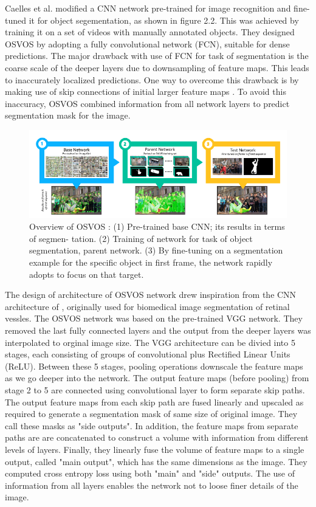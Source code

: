 Caelles et al. \cite{osvos} modified a CNN network pre-trained for image recognition and fine-tuned it for object segementation, as shown in figure 2.2. This was achieved by training it on a set of videos with manually annotated objects. They designed OSVOS by adopting a fully convolutional network (FCN), suitable for dense predictions. The major drawback with use of FCN for task of segmentation is the coarse scale of the deeper layers due to downsampling of feature maps. This leads to inaccurately localized predictions. One way to overcome this drawback is by making use of skip connections of initial larger feature maps \cite{unet}. To avoid this inaccuracy, OSVOS combined information from all network layers to predict segmentation mask for the image. \par

\begin{figure}[h!]\label{fig:osvos1}
\centering
 \includegraphics[width=1.0\linewidth]{figures/osvos_train.png} 
\caption{Overview of OSVOS \cite{osvos}: (1) Pre-trained base CNN; its results in terms of segmen-
tation. (2) Training of network for task of object segmentation, parent network. (3) By fine-tuning on a segmentation example for the specific object in first frame, the network rapidly adopts to focus on that target.
}
\end{figure}

 The design of architecture of OSVOS network drew inspiration from the CNN architecture of \cite{maninis:2016}, originally used for biomedical image segmentation of retinal vessles. The OSVOS network was based on the pre-trained VGG \cite{vgg} network. They removed the last fully connected layers and the output from the deeper layers was interpolated to orginal image size. The VGG architecture can be divied into 5 stages, each consisting of groups of convolutional plus Rectified Linear Units (ReLU). Between these  5 stages, pooling operations downscale the feature maps as we go deeper into the network. The output feature maps (before pooling) from stage 2 to 5 are connected using convolutional layer to form separate skip paths. The output feature maps from each skip path are fused linearly and upscaled as required to generate a segmentation mask of same size of original image. They call these masks as "side outputs". In addition, the feature maps from separate paths are are concatenated to construct a volume with information from different levels of layers. Finally, they linearly fuse the volume of feature maps to a single output, called "main output", which has the same dimensions as the image. They computed cross entropy loss using both "main" and "side" outputs. The use of information from all layers enables the network not to loose finer details of the image.



